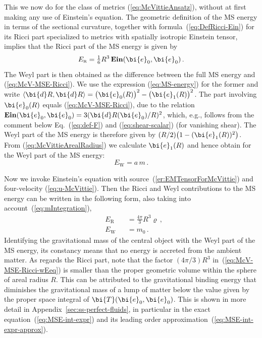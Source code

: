 \documentclass
[rmp,aps,twocolumn,showpacs,preprintnumbers,amsmath,amssymb]{revtex4}
\theoremstyle{plain}
\theoremstyle{definition}
\theoremstyle{remark}
\newcommand{\sss}{\scriptscriptstyle}
\newcommand{\ind}[1]{{\sss \text{#1}}}        %
\newcommand{\br}[1]{\mathbf{#1}}              %
\newcommand{\sprod}[2]{\langle#1,#2\rangle}   %
\DeclareMathOperator{\Ein}{\br{Ein}}          %
\newcommand{\ed}{\bi{d}}                      %
\newcommand{\be}{\bi{e}}
\newcommand{\bT}{\bi{T}}
\begin{document}
This we now do for the class of metrics (\ref{eq:McVittieAnsatz}),
without at first making any use of Einstein's equation. The geometric 
definition of the MS energy in terms of the sectional curvature, 
together with formula~(\ref{eq:DefRicci-Ein}) for its Ricci part 
specialized to metrics with spatially isotropic Einstein tensor, 
implies that the Ricci part of the MS energy is given by 
%
\begin{equation}\label{eq:McV-MSE-Ricci}
  E_\ind{R} = \tfrac{1}{6}R^3 \Ein(\be_0,\be_0)\,.
\end{equation}
%
The Weyl part is then obtained as the difference between the full 
MS energy and (\ref{eq:McV-MSE-Ricci}). We use the expression 
(\ref{eq:MS-energy}) for the former and write 
$\sprod{\ed R}{\ed R}=\bigl(\be_0(R)\bigr)^2-\bigl(\be_1(R)\bigr)^2$. 
The part involving $\be_0(R)$ equals (\ref{eq:McV-MSE-Ricci}), due to the 
relation $\Ein(\be_0,\be_0)=3(\ed R(\be_0)/R)^2$, which, e.g., follows 
from the comment below Eq.~(\ref{eq:def-F}) and (\ref{eq:shear-scalar}) 
(for vanishing shear). The Weyl part of the MS energy is therefore given 
by $(R/2)\bigl(1-(\be_1(R))^2\bigr)$. From (\ref{eq:McVittieArealRadius}) 
we calculate $\be_1(R)$ and hence obtain for the Weyl part of the MS energy: 
%
\begin{equation}\label{eq:McV-MSE-Weyl}
  E_\ind{W} = a\,m\,.
\end{equation}
%

Now we invoke Einstein's equation with source~(\ref{er:EMTensorForMcVittie}) 
and four-velocity (\ref{eq:u-McVittie}). Then the Ricci and Weyl 
contributions to the MS energy can be written in the following form,
also taking into account~(\ref{eq:mIntegration}), 
%
\begin{subequations}\label{eq:McV-MSE-wEeq}
\begin{alignat}{3}
  &E_\ind{R} &&= \frac{4\pi}{3}R^3 \varrho \,, 
  \label{eq:McV-MSE-Ricci-wEeq} \\
  &E_\ind{W} &&= m_0 \,.
  \label{eq:McV-MSE-Weyl-wEeq}
\end{alignat}
\end{subequations}
%
Identifying the gravitational mass of the central object with the Weyl 
part of the MS energy, its constancy means that no energy is accreted 
from the ambient matter. As regards the Ricci part, note that the 
factor $(4\pi/3) R^3$ in~(\ref{eq:McV-MSE-Ricci-wEeq}) is smaller than 
the proper geometric volume within the sphere of areal radius $R$. 
This can be attributed to the gravitational binding energy that 
diminishes the gravitational mass of a lump of matter below the value 
given by the proper space integral of $\bT(\be_0,\be_0)$. This is shown 
in more detail in Appendix~\ref{sec:ss-perfect-fluids}, in particular 
in the exact equation~(\ref{eq:MSE-int-expr}) and its leading order 
approximation~(\ref{eq:MSE-int-expr-approx}). 
\end{document}
